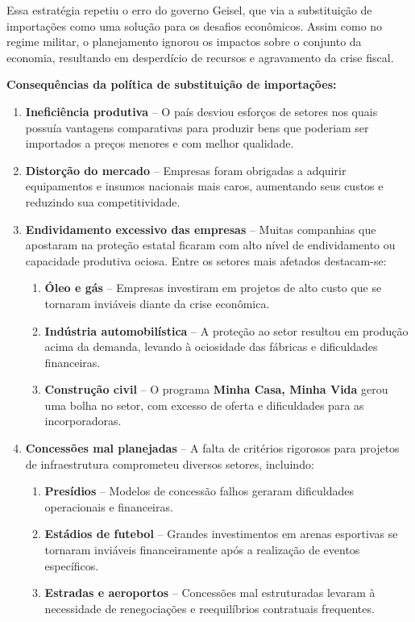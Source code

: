 \documentclass[a4paper,12pt]{article}[abntex2]
\begin{document}
Essa estratégia repetiu o erro do governo Geisel, que via a substituição de importações como uma solução para os desafios econômicos. Assim como no regime militar, o planejamento ignorou os impactos sobre o conjunto da economia, resultando em desperdício de recursos e agravamento da crise fiscal.

\textbf{Consequências da política de substituição de importações:}

\begin{enumerate}
    \item \textbf{Ineficiência produtiva} – O país desviou esforços de setores nos quais possuía vantagens comparativas para produzir bens que poderiam ser importados a preços menores e com melhor qualidade.
    \item \textbf{Distorção do mercado} – Empresas foram obrigadas a adquirir equipamentos e insumos nacionais mais caros, aumentando seus custos e reduzindo sua competitividade.
    \item \textbf{Endividamento excessivo das empresas} – Muitas companhias que apostaram na proteção estatal ficaram com alto nível de endividamento ou capacidade produtiva ociosa. Entre os setores mais afetados destacam-se:
    \begin{enumerate}
        \item \textbf{Óleo e gás} – Empresas investiram em projetos de alto custo que se tornaram inviáveis diante da crise econômica.
        \item \textbf{Indústria automobilística} – A proteção ao setor resultou em produção acima da demanda, levando à ociosidade das fábricas e dificuldades financeiras.
        \item \textbf{Construção civil} – O programa \textbf{Minha Casa, Minha Vida} gerou uma bolha no setor, com excesso de oferta e dificuldades para as incorporadoras.
    \end{enumerate}
    \item \textbf{Concessões mal planejadas} – A falta de critérios rigorosos para projetos de infraestrutura comprometeu diversos setores, incluindo:
    \begin{enumerate}
        \item \textbf{Presídios} – Modelos de concessão falhos geraram dificuldades operacionais e financeiras.
        \item \textbf{Estádios de futebol} – Grandes investimentos em arenas esportivas se tornaram inviáveis financeiramente após a realização de eventos específicos.
        \item \textbf{Estradas e aeroportos} – Concessões mal estruturadas levaram à necessidade de renegociações e reequilíbrios contratuais frequentes.
    \end{enumerate}
\end{enumerate}
\end{document}
